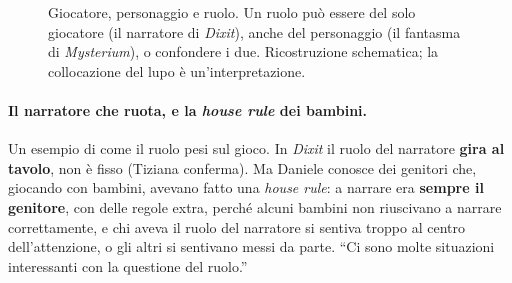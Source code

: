 \begin{figure}[htbp]
\centering
{}
\caption{Giocatore, personaggio e ruolo. Un ruolo può essere del solo giocatore (il narratore
di \emph{Dixit}), anche del personaggio (il fantasma di \emph{Mysterium}), o confondere i due.
Ricostruzione schematica; la collocazione del lupo è un'interpretazione.}
\label{a16:fig:ruoli}
\end{figure}

\paragraph{Il narratore che ruota, e la \emph{house rule} dei bambini.} Un esempio di come il
ruolo pesi sul gioco. In \emph{Dixit} il ruolo del narratore \textbf{gira al tavolo}, non è fisso
(Tiziana conferma). Ma Daniele conosce dei genitori che, giocando con bambini, avevano fatto una
\emph{house rule}: a narrare era \textbf{sempre il genitore}, con delle regole extra, perché
alcuni bambini non riuscivano a narrare correttamente, e chi aveva il ruolo del narratore si
sentiva troppo al centro dell'attenzione, o gli altri si sentivano messi da parte. ``Ci sono
molte situazioni interessanti con la questione del ruolo.''

